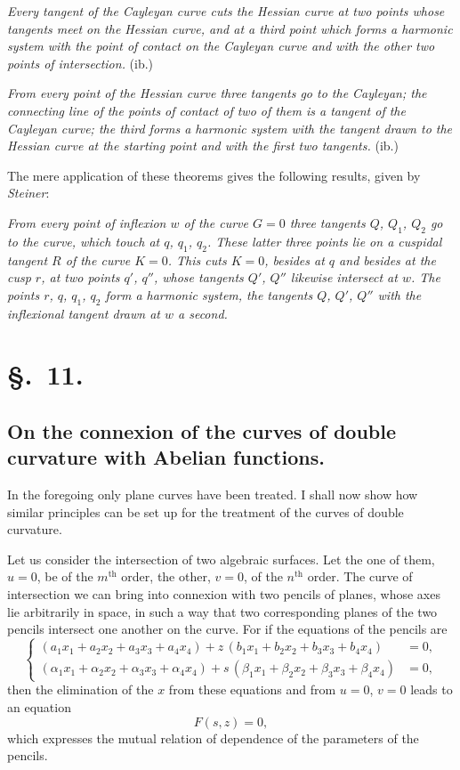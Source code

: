 \documentclass{article}
\begin{document}
\emph{Every tangent of the Cayleyan curve cuts the Hessian curve at two points whose tangents meet on the Hessian curve, and at a third point which forms a harmonic system with the point of contact on the Cayleyan curve and with the other two points of intersection.} (ib.)


\emph{From every point of the Hessian curve three tangents go to the Cayleyan; the connecting line of the points of contact of two of them is a tangent of the Cayleyan curve; the third forms a harmonic system with the tangent drawn to the Hessian curve at the starting point and with the first two tangents.} (ib.)

The mere application of these theorems gives the following results, given by \emph{Steiner}:

\emph{From every point of inflexion $w$ of the curve $G=0$ three tangents $Q$, $Q_{1}$, $Q_{2}$ go to the curve, which touch at $q$, $q_{1}$, $q_{2}$. These latter three points lie on a cuspidal tangent $R$ of the curve $K=0$. This cuts $K=0$, besides at $q$ and besides at the cusp $r$, at two points $q'$, $q''$, whose tangents $Q'$, $Q''$ likewise intersect at $w$. The points $r$, $q$, $q_{1}$, $q_{2}$ form a harmonic system, the tangents $Q$, $Q'$, $Q''$ with the inflexional tangent drawn at $w$ a second.}

\section*{§.~11.}

\subsection*{On the connexion of the curves of double curvature with Abelian functions.}

In the foregoing only plane curves have been treated. I shall now show how similar principles can be set up for the treatment of the curves of double curvature.

Let us consider the intersection of two algebraic surfaces. Let the one of them, $u=0$, be of the $m^{\text{th}}$ order, the other, $v=0$, of the $n^{\text{th}}$ order. The curve of intersection we can bring into connexion with two pencils of planes, whose axes lie arbitrarily in space, in such a way that two corresponding planes of the two pencils intersect one another on the curve. For if the equations of the pencils are
\[
\left\{
\begin{aligned}
(a_{1} x_{1}+a_{2} x_{2}+a_{3} x_{3}+a_{4} x_{4})+z\,(b_{1} x_{1}+b_{2} x_{2}+b_{3} x_{3}+b_{4} x_{4}) &= 0,\\
(\alpha_{1} x_{1}+\alpha_{2} x_{2}+\alpha_{3} x_{3}+\alpha_{4} x_{4})+s\,(\beta_{1} x_{1}+\beta_{2} x_{2}+\beta_{3} x_{3}+\beta_{4} x_{4}) &= 0,
\end{aligned}
\right. \tag{17.}
\]
then the elimination of the $x$ from these equations and from $u=0$, $v=0$ leads to an equation
\[
F(s,z) = 0, \tag{18.}
\]
which expresses the mutual relation of dependence of the parameters of the pencils.
\end{document}
